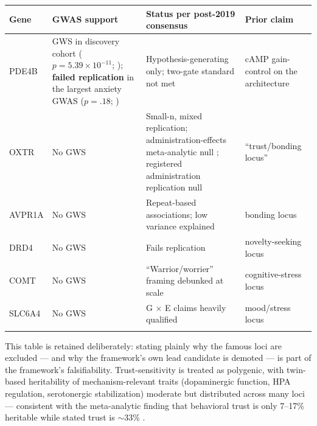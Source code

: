 \documentclass[
]{article}
\newcounter{none} %
\begin{document}
{\def\LTcaptype{none} %
\begin{longtable}[]{@{}
  >{\raggedright\arraybackslash}p{}
  >{\raggedright\arraybackslash}p{}
  >{\raggedright\arraybackslash}p{}
  >{\raggedright\arraybackslash}p{}@{}}
\toprule\noalign{}
\begin{minipage}[b]{\linewidth}\raggedright
Gene
\end{minipage} & \begin{minipage}[b]{\linewidth}\raggedright
GWAS support
\end{minipage} & \begin{minipage}[b]{\linewidth}\raggedright
Status per post-2019 consensus
\end{minipage} & \begin{minipage}[b]{\linewidth}\raggedright
Prior claim
\end{minipage} \\
\midrule\noalign{}
\endhead
\bottomrule\noalign{}
\endlastfoot
PDE4B & GWS in discovery cohort (\(p = 5.39 \times 10^{-11}\); );
\textbf{failed replication} in the largest anxiety GWAS (\(p = .18\); )
& Hypothesis-generating only; two-gate standard not met & cAMP
gain-control on the architecture \\
OXTR & No GWS & Small-n, mixed replication; administration-effects
meta-analytic null ; registered administration replication null &
``trust/bonding locus'' \\
AVPR1A & No GWS & Repeat-based associations; low variance explained &
bonding locus \\
DRD4 & No GWS & Fails replication & novelty-seeking locus \\
COMT & No GWS & ``Warrior/worrier'' framing debunked at scale &
cognitive-stress locus \\
SLC6A4 & No GWS & G \(\times\) E claims heavily qualified & mood/stress
locus \\
& & & \\
\end{longtable}
}

This table is retained deliberately: stating plainly why the famous loci
are excluded --- and why the framework's own lead candidate is demoted
--- is part of the framework's falsifiability. Trust-sensitivity is
treated as polygenic, with twin-based heritability of mechanism-relevant
traits (dopaminergic function, HPA regulation, serotonergic
stabilization) moderate but distributed across many loci --- consistent
with the meta-analytic finding that behavioral trust is only 7--17\%
heritable while stated trust is \(\sim\)33\% .
\end{document}
